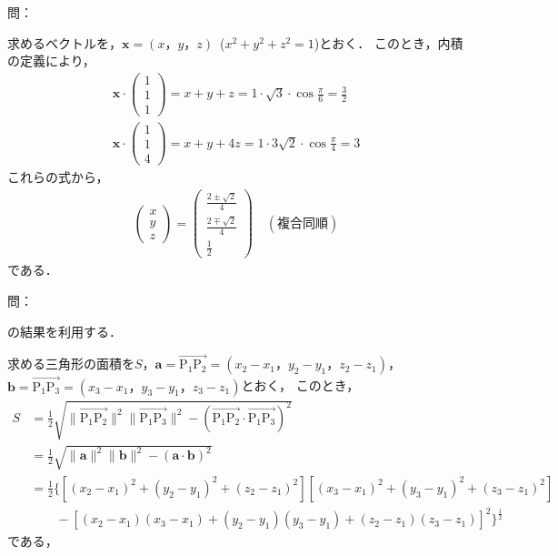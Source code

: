 \documentclass[dvipdfmx,uplatex,11pt]{jsarticle}
\theoremstyle{definition}
\begin{document}
問：
\begin{leftbar}
    求めるベクトルを，$\bm{x}=(x，y，z)$~($x^2+y^2 +z^2=1$)とおく．
    このとき，内積の定義により，
    \begin{gather*}
        \bm{x} \cdot \left(
            \begin{array}{c}
                1 \\
                1 \\
                1
            \end{array}
        \right)
        =x+y+z= 1 \cdot \sqrt{3} \cdot \cos \frac{\pi}{6} =\frac{3}{2}　\\
        \bm{x} \cdot \left(
            \begin{array}{c}
                1 \\
                1 \\
                4
            \end{array}
        \right)
        =x+y+4z= 1 \cdot 3\sqrt{2} \cdot \cos \frac{\pi}{4} =3
        \end{gather*}
        これらの式から，
        \begin{gather*}
        \left(
            \begin{array}{c}
            x \\
            y \\
            z  
    \end{array}
        \right)
    =
            \left(
                \begin{array}{c}
                \frac{2 \pm \sqrt{2}}{4} \\
                \frac{2 \mp \sqrt{2}}{4} \\
                \frac{1}{2} 
    \end{array}
            \right)\quad (\text{複合同順})
    \end{gather*}
        である．
    \end{leftbar}

問： 
\begin{leftbar}
	[1.4]の結果を利用する．\par 
	求める三角形の面積を$S$，$\bm{a}=\overrightarrow{\mathrm{P_1 P_2}}=(x_2-x_1，y_2-y_1，z_2-z_1)$，$\bm{b}=\overrightarrow{\mathrm{P_1 P_3}}=(x_3-x_1，y_3-y_1，z_3-z_1)$とおく，
	このとき，
	\begin{align*}
		S & = \frac{1}{2} \sqrt{\|\overrightarrow{\mathrm{P_1 P_2}}\|^2 \|\overrightarrow{\mathrm{P_1 P_3}}\|^2 - (\overrightarrow{\mathrm{P_1 P_2}} \cdot \overrightarrow{\mathrm{P_1 P_3}})^2} \\
		  & = \frac{1}{2} \sqrt{\|\bm{a}\|^2 \|\bm{b}\|^2 - (\bm{a}\cdot \bm{b})^2 } \\
		  & = \frac{1}{2} \{[(x_2 - x_1)^2+(y_2-y_1)^2+ (z_2 - z_1)^2][(x_3 - x_1)^2+(y_3-y_1)^2+ (z_3 - z_1)^2]\\
		  & \qquad - [(x_2-x_1)(x_3-x_1)+(y_2 -y_1)(y_3-y_1)+(z_2-z_1)(z_3-z_1)]^2\}^{\frac{1}{2}}
	\end{align*}
	である，
\end{leftbar}
	
\end{document}
